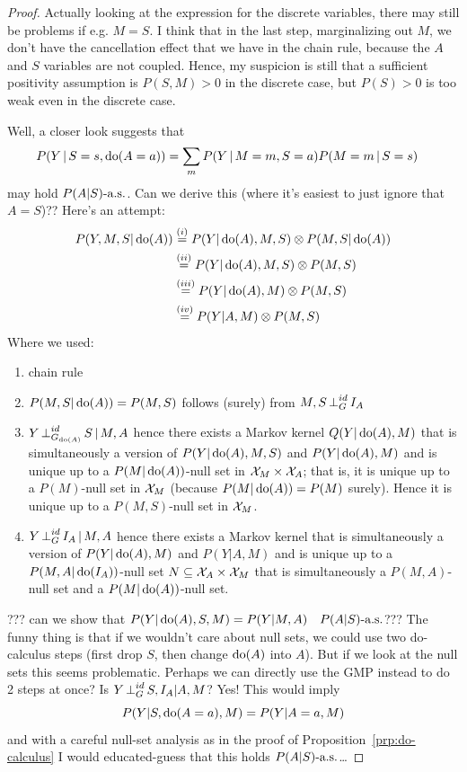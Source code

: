 \begin{proof}
Actually looking at the expression for the discrete variables, there may still be problems if e.g. $M=S$.
I think that in the last step, marginalizing out $M$, we don't have the cancellation effect that we have in the chain rule, because the $A$ and $S$ variables are not coupled.
Hence, my suspicion is still that a sufficient positivity assumption is $P(S,M) > 0$ in the discrete case, but $P(S) > 0$ is too weak even in the discrete case.

Well, a closer look suggests that 
\begin{equation*}\begin{split}
  &P(Y \operatorname*{|} S=s, \operatorname{do}(A=a)) = \sum_m P(Y \operatorname*{|} M=m, S=a) P(M=m \operatorname*{|} S=s)
\end{split}\end{equation*}
may hold $P(A|S)\text{-a.s.}$. Can we derive this (where it's easiest to just ignore that $A=S$)??
Here's an attempt:
  \begin{equation*}\begin{split}
    P(Y,M,S | \operatorname{do}(A))
    &\overset{(i)}{=}  P(Y | \operatorname{do}(A),M,S) \otimes P(M,S|\operatorname{do}(A)) \\
    &\overset{(ii)}{=} P(Y | \operatorname{do}(A),M,S) \otimes P(M,S) \\
    &\overset{(iii)}{=} P(Y | \operatorname{do}(A),M) \otimes P(M,S) \\
    &\overset{(iv)}{=} P(Y | A,M) \otimes P(M,S)
  \end{split}\end{equation*}
Where we used:
\begin{enumerate}[label=(\roman*)]
  \item chain rule
  \item $P(M,S|\operatorname{do}(A)) = P(M,S)$ follows (surely) from $M,S \operatorname*{\perp}^{id}_G I_A$
  \item $Y \operatorname*{\perp}^{id}_{G_{\operatorname{do}(A)}} S \operatorname*{|} M, A$ hence there exists a Markov kernel
    $Q(Y|\operatorname{do}(A),M)$ that is simultaneously a version of $P(Y|\operatorname{do}(A),M,S)$ and $P(Y|\operatorname{do}(A),M)$ and is unique up to a $P(M|\operatorname{do}(A))$-null set in $\mathcal{X}_M \times \mathcal{X}_A$;
    that is, it is unique up to a $P(M)$-null set in $\mathcal{X}_M$ (because $P(M|\operatorname{do}(A)) = P(M)$ surely).
    Hence it is unique up to a $P(M,S)$-null set in $\mathcal{X}_M$.
  \item $Y \operatorname*{\perp}^{id}_G I_A \operatorname*{|} M, A$ hence there exists a Markov kernel
    that is simultaneously a version of $P(Y|\operatorname{do}(A),M)$ and $P(Y|A,M)$ and is unique up to a $P(M,A|\operatorname{do}(I_A))$-null set $N \subseteq \mathcal{X}_A \times \mathcal{X}_M$
    that is simultaneously a $P(M,A)$-null set and a $P(M|\operatorname{do}(A))$-null set.
\end{enumerate}
??? can we show that $P(Y|\operatorname{do}(A),S,M) = P(Y|M,A)\quad P(A|S)\text{-a.s.}$???
    The funny thing is that if we wouldn't care about null sets, we could use two do-calculus steps (first drop $S$, then change $\operatorname{do}(A)$ into $A$).
    But if we look at the null sets this seems problematic.
    Perhaps we can directly use the GMP instead to do 2 steps at once?
    Is $Y \operatorname*{\perp}^{id}_G S,I_A | A,M$? Yes!
    This would imply
    $$P(Y|S,\operatorname{do}(A=a),M)=P(Y|A=a,M)$$
    and with a careful null-set analysis as in the proof of Proposition~\ref{prp:do-calculus}
    I would educated-guess that this holds $P(A|S)\text{-a.s.}$\dots


\end{proof}
